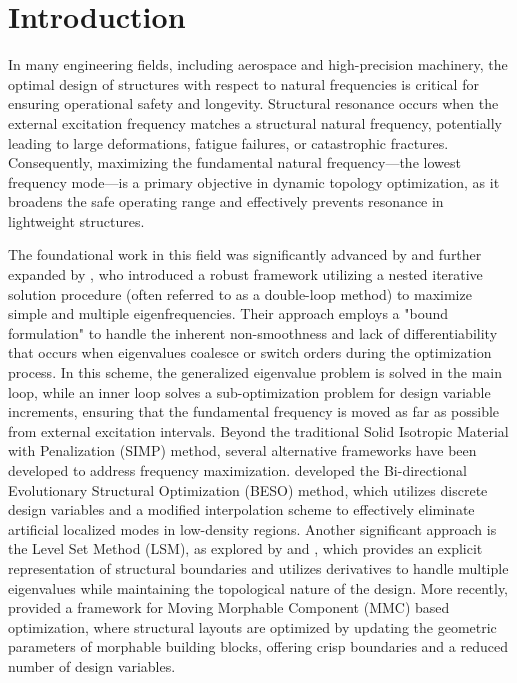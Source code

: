 \documentclass[applsci,article,submit,pdftex,moreauthors]{Definitions/mdpi}
\begin{document}
\section{Introduction}
In many engineering fields, including aerospace and high-precision machinery, the optimal design of structures with respect to natural frequencies is critical for ensuring operational safety and longevity. Structural resonance occurs when the external excitation frequency matches a structural natural frequency, potentially leading to large deformations, fatigue failures, or catastrophic fractures. Consequently, maximizing the fundamental natural frequency—the lowest frequency mode—is a primary objective in dynamic topology optimization, as it broadens the safe operating range and effectively prevents resonance in lightweight structures.

The foundational work in this field was significantly advanced by \citet{DU2007} and further expanded by \citet{OLHOFF2014}, who introduced a robust framework utilizing a nested iterative solution procedure (often referred to as a double-loop method) to maximize simple and multiple eigenfrequencies. Their approach employs a "bound formulation" to handle the inherent non-smoothness and lack of differentiability that occurs when eigenvalues coalesce or switch orders during the optimization process. In this scheme, the generalized eigenvalue problem is solved in the main loop, while an inner loop solves a sub-optimization problem for design variable increments, ensuring that the fundamental frequency is moved as far as possible from external excitation intervals.
Beyond the traditional Solid Isotropic Material with Penalization (SIMP) method, several alternative frameworks have been developed to address frequency maximization. \citet{HUANG2010} developed the Bi-directional Evolutionary Structural Optimization (BESO) method, which utilizes discrete design variables and a modified interpolation scheme to effectively eliminate artificial localized modes in low-density regions. Another significant approach is the Level Set Method (LSM), as explored by \citet{XIA2011} and \citet{SHU2014}, which provides an explicit representation of structural boundaries and utilizes derivatives to handle multiple eigenvalues while maintaining the topological nature of the design. More recently, \citet{HUANG2025} provided a framework for Moving Morphable Component (MMC) based optimization, where structural layouts are optimized by updating the geometric parameters of morphable building blocks, offering crisp boundaries and a reduced number of design variables.
\end{document}
